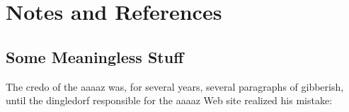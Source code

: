 \documentclass[letterpaper,12pt,titlepage,oneside,final]{book}
\let\origdoublepage\cleardoublepage
\newcommand{\clearemptydoublepage}{%
  \clearpage{\pagestyle{empty}\origdoublepage}}
\let\cleardoublepage\clearemptydoublepage
\begin{document}
% 

\part{Notes and References}

\chapter{Some Meaningless Stuff}


The credo of the \gls{aaaaz} was, for several years, several paragraphs of gibberish, until the \gls{dingledorf} responsible for the \gls{aaaaz} Web site realized his mistake:



% 
% 
% 
% 
% 
% 
% 
% 


\renewcommand*{\abbreviationsname}{List of Abbreviations}
\printglossary[type=abbreviations]
\cleardoublepage
{}		%

\printglossary[type=symbols]
\cleardoublepage
{}		%




\cleardoublepage %
\renewcommand*{\bibname}{References}

% 

\printglossary
\cleardoublepage
{}		%
\end{document}
